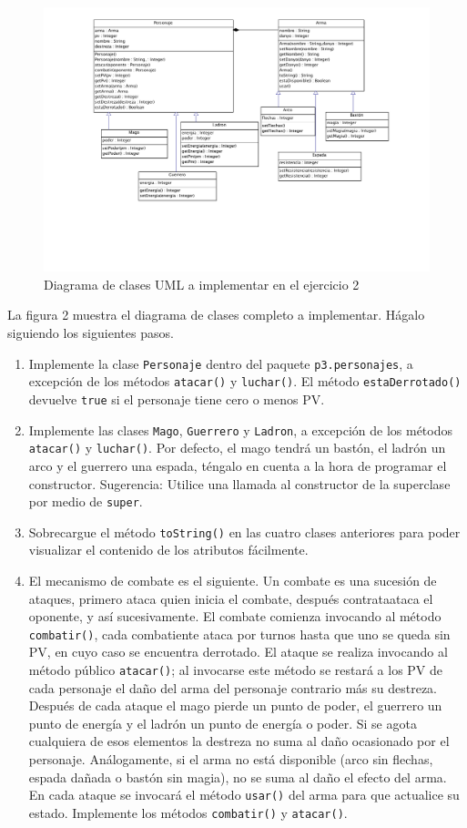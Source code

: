 \documentclass[english,a4paper,11pt]{article}
\begin{document}
\begin{figure}
  \centering
  \includegraphics[width=\textwidth]{figs/ej2}
  \caption{Diagrama de clases UML a implementar en el ejercicio 2}
  \label{fig:ej2}
\end{figure}

La figura 2 muestra el diagrama de clases completo a implementar. Hágalo siguiendo los siguientes pasos.

\begin{enumerate}
\item Implemente la clase \texttt{Personaje} dentro del paquete \texttt{p3.personajes}, a excepción de los métodos \texttt{atacar()} y \texttt{luchar()}. El método \texttt{estaDerrotado()} devuelve \texttt{true} si el personaje tiene cero o menos PV.
\item Implemente las clases \texttt{Mago}, \texttt{Guerrero} y \texttt{Ladron}, a excepción de los métodos \texttt{atacar()} y \texttt{luchar()}. Por defecto, el mago tendrá un bastón, el ladrón un arco y el guerrero una espada, téngalo en cuenta a la hora de programar el constructor. Sugerencia: Utilice una llamada al constructor de la superclase por medio de \texttt{super}.
\item Sobrecargue el método \texttt{toString()} en las cuatro clases anteriores para poder visualizar el contenido de los atributos fácilmente.
\item El mecanismo de combate es el siguiente. Un combate es una sucesión de ataques, primero ataca quien inicia el combate, después contrataataca el oponente, y así sucesivamente. El combate comienza invocando al método \texttt{combatir()}, cada combatiente ataca por turnos hasta que uno se queda sin PV, en cuyo caso se encuentra derrotado. El ataque se realiza invocando al método público \texttt{atacar()}; al invocarse este método se restará a los PV de cada personaje el daño del arma del personaje contrario más su destreza. Después de cada ataque el mago pierde un punto de poder, el guerrero un punto de energía y el ladrón un punto de energía o poder. Si se agota cualquiera de esos elementos la destreza no suma al daño ocasionado por el personaje. Análogamente, si el arma no está disponible (arco sin flechas, espada dañada o bastón sin magia), no se suma al daño el efecto del arma.  En cada ataque se invocará el método \texttt{usar()} del arma para que actualice su estado. Implemente los métodos \texttt{combatir()} y \texttt{atacar()}.
\end{enumerate}
\end{document}
